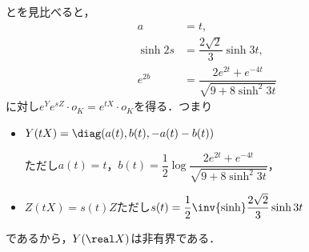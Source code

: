 \begin{npfwn}
  とを見比べると，
  \begin{align*}
    a &= t,\\
    \sinh 2s &= \dfrac{2\sqrt{2}}{3}\sinh 3t, \\
    e^{2b} &= \dfrac{2e^{2t} + e^{-4t}}{\sqrt{9 + 8\sinh^2 3t}}
  \end{align*}
  に対し$e^{Y}e^{sZ}\cdot o_K = e^{tX}\cdot o_K $を得る．つまり
  \begin{itemize}
  \item $Y(tX) = \diag(a(t) ,b(t) ,-a(t) -b(t) ) $

    ただし$a(t) = t$，$b(t) =\dfrac{1}{2} \log \dfrac{2e^{2t} + e^{-4t}}{\sqrt{9 + 8\sinh^2 3t}} $，
  \item $Z(tX) = s(t)Z  $ただし$s(t) = \dfrac{1}{2} \inv{\sinh}\dfrac{2\sqrt{2}}{3}\sinh 3t $
  \end{itemize}
  であるから，$Y(\real X) $は非有界である．  
\end{npfwn}
